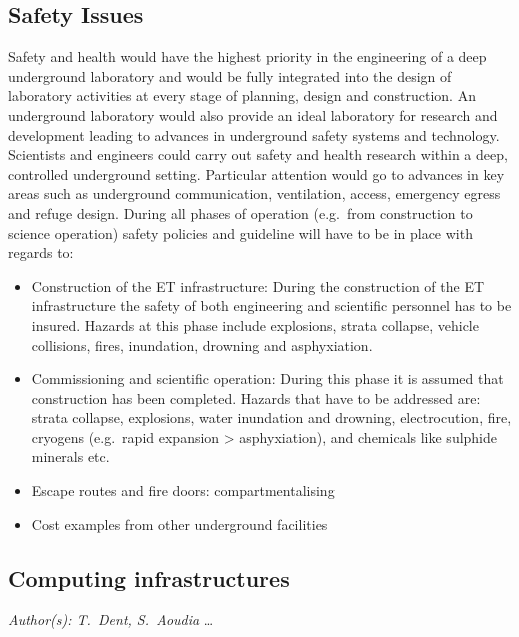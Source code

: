 






\FloatBarrier
\subsection{Safety Issues}
Safety and health would have the highest priority in the engineering of a deep underground laboratory and would be fully integrated into the design of laboratory activities at every stage of planning, design and construction. An underground laboratory would also provide an ideal laboratory for research and development leading to advances in underground safety systems and technology. Scientists and engineers could carry out safety and health research within a deep, controlled underground setting. Particular attention would go to advances in key areas such as underground communication, ventilation, access, emergency egress and refuge design. During all phases of operation (e.g.\ from construction to science operation) safety policies and guideline will have to be in place with regards to: 
\begin{itemize}
\item{Construction of the ET infrastructure:}
During the construction of the ET infrastructure the safety of both engineering and scientific personnel has to be insured. Hazards at this phase include explosions, strata collapse, vehicle collisions, fires, inundation, drowning and asphyxiation.    
\item{Commissioning and scientific operation:}
During this phase it is assumed that construction has been completed. Hazards that have to be addressed are: strata collapse, explosions, water inundation and drowning, electrocution, fire, cryogens (e.g.\ rapid expansion > asphyxiation), and chemicals like sulphide minerals etc.
\item{Escape routes and fire doors: compartmentalising}
\item{Cost examples from other underground facilities}
\end{itemize}



\FloatBarrier
\subsection{Computing infrastructures}
\emph{
Author(s): T.\ Dent, S.\ Aoudia
}
\dots

